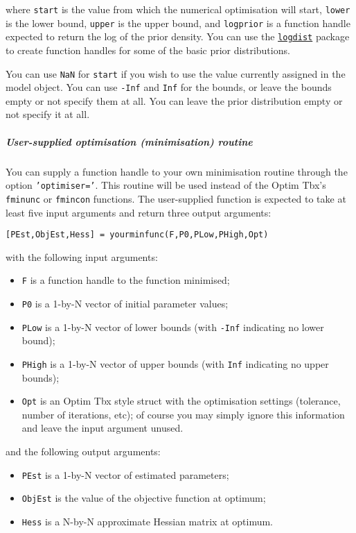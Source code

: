 where \texttt{start} is the value from which the numerical optimisation
will start, \texttt{lower} is the lower bound, \texttt{upper} is the
upper bound, and \texttt{logprior} is a function handle expected to
return the log of the prior density. You can use the
\href{logdist/Contents}{\texttt{logdist}} package to create function
handles for some of the basic prior distributions.

You can use \texttt{NaN} for \texttt{start} if you wish to use the value
currently assigned in the model object. You can use \texttt{-Inf} and
\texttt{Inf} for the bounds, or leave the bounds empty or not specify
them at all. You can leave the prior distribution empty or not specify
it at all.

\subparagraph{User-supplied optimisation (minimisation)
routine}\label{user-supplied-optimisation-minimisation-routine}

You can supply a function handle to your own minimisation routine
through the option \texttt{'optimiser='}. This routine will be used
instead of the Optim Tbx's \texttt{fminunc} or \texttt{fmincon}
functions. The user-supplied function is expected to take at least five
input arguments and return three output arguments:

\begin{verbatim}
[PEst,ObjEst,Hess] = yourminfunc(F,P0,PLow,PHigh,Opt)
\end{verbatim}

with the following input arguments:

\begin{itemize}
\itemsep1pt\parskip0pt
\item
  \texttt{F} is a function handle to the function minimised;
\item
  \texttt{P0} is a 1-by-N vector of initial parameter values;
\item
  \texttt{PLow} is a 1-by-N vector of lower bounds (with \texttt{-Inf}
  indicating no lower bound);
\item
  \texttt{PHigh} is a 1-by-N vector of upper bounds (with \texttt{Inf}
  indicating no upper bounds);
\item
  \texttt{Opt} is an Optim Tbx style struct with the optimisation
  settings (tolerance, number of iterations, etc); of course you may
  simply ignore this information and leave the input argument unused.
\end{itemize}

and the following output arguments:

\begin{itemize}
\itemsep1pt\parskip0pt
\item
  \texttt{PEst} is a 1-by-N vector of estimated parameters;
\item
  \texttt{ObjEst} is the value of the objective function at optimum;
\item
  \texttt{Hess} is a N-by-N approximate Hessian matrix at optimum.
\end{itemize}

